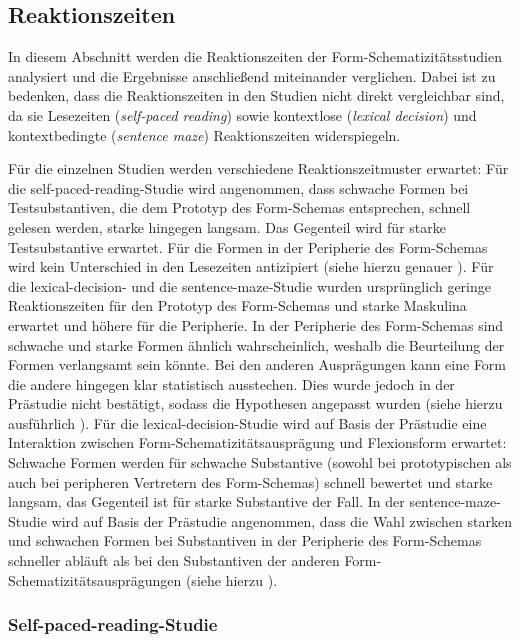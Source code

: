 \subsection{Reaktionszeiten}

In diesem Abschnitt werden die Reaktionszeiten der Form-Schematizitätsstudien analysiert und die Ergebnisse anschließend miteinander verglichen. Dabei ist zu bedenken, dass die Reaktionszeiten in den Studien nicht direkt vergleichbar sind, da sie Lesezeiten (\textit{self-paced reading}) sowie kontextlose (\textit{lexical decision}) und kontextbedingte (\textit{sentence maze}) Reaktionszeiten  widerspiegeln.

 
Für die einzelnen Studien werden verschiedene Reaktionszeitmuster erwartet: Für die self-paced-reading-Studie wird angenommen, dass schwache Formen bei Testsubstantiven, die dem Prototyp des Form-Schemas entsprechen, schnell gelesen werden, starke hingegen langsam. Das Gegenteil wird für starke Testsubstantive erwartet. Für die Formen in der Peripherie des Form-Schemas wird kein Unterschied in den Lesezeiten antizipiert (siehe hierzu genauer ). Für die lexical-decision- und die sentence-maze-Studie wurden ursprünglich geringe Reaktionszeiten für den Prototyp des Form-Schemas und starke Maskulina erwartet und höhere für die Peripherie. In der Peripherie des Form-Schemas sind schwache und starke Formen ähnlich wahrscheinlich, weshalb die Beurteilung der Formen verlangsamt sein könnte. Bei den anderen Ausprägungen kann eine Form die andere hingegen klar statistisch ausstechen. Dies wurde jedoch in der Prästudie nicht bestätigt, sodass die Hypothesen angepasst wurden (siehe hierzu ausführlich ). Für die lexical-decision-Studie wird auf Basis der Prästudie eine Interaktion zwischen Form-Schematizitätsausprägung und Flexionsform erwartet: Schwache Formen werden für schwache Substantive (sowohl bei prototypischen als auch bei peripheren Vertretern des Form-Schemas) schnell bewertet und starke langsam, das Gegenteil ist für starke Substantive der Fall. In der sentence-maze-Studie wird auf Basis der Prästudie angenommen, dass die Wahl zwischen starken und schwachen Formen bei Substantiven in der Peripherie des Form-Schemas schneller abläuft als bei den Substantiven der anderen Form-Schematizitätsausprägungen (siehe hierzu ). 

\subsubsection{Self-paced-reading-Studie}\largerpage[-1]

